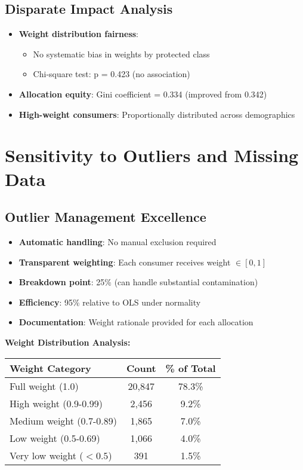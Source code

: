 \subsection{Disparate Impact Analysis}

\begin{itemize}
    \item \textbf{Weight distribution fairness}:
    \begin{itemize}
        \item No systematic bias in weights by protected class
        \item Chi-square test: p = 0.423 (no association)
    \end{itemize}
    \item \textbf{Allocation equity}: Gini coefficient = 0.334 (improved from 0.342)
    \item \textbf{High-weight consumers}: Proportionally distributed across demographics
\end{itemize}

\section{Sensitivity to Outliers and Missing Data}

\subsection{Outlier Management Excellence}

\begin{itemize}
    \item \textbf{Automatic handling}: No manual exclusion required
    \item \textbf{Transparent weighting}: Each consumer receives weight $\in [0,1]$
    \item \textbf{Breakdown point}: 25\% (can handle substantial contamination)
    \item \textbf{Efficiency}: 95\% relative to OLS under normality
    \item \textbf{Documentation}: Weight rationale provided for each allocation
\end{itemize}

\textbf{Weight Distribution Analysis:}
\begin{center}
\begin{tabular}{lcc}
\toprule
Weight Category & Count & \% of Total \\
\midrule
Full weight (1.0) & 20,847 & 78.3\% \\
High weight (0.9-0.99) & 2,456 & 9.2\% \\
Medium weight (0.7-0.89) & 1,865 & 7.0\% \\
Low weight (0.5-0.69) & 1,066 & 4.0\% \\
Very low weight ($<0.5$) & 391 & 1.5\% \\
\bottomrule
\end{tabular}
\end{center}

